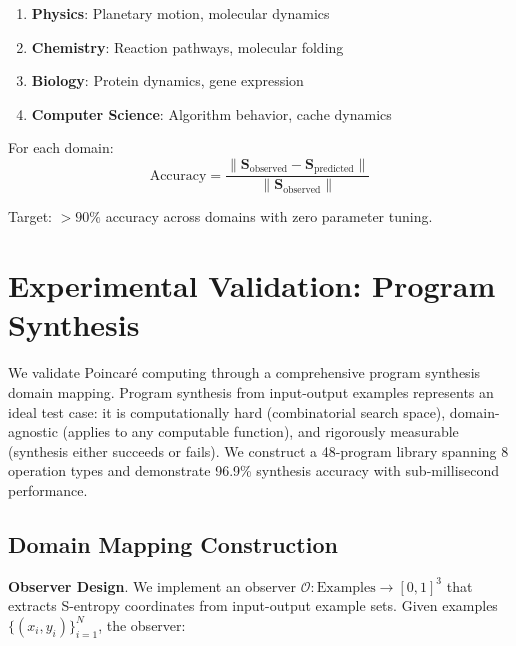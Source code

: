 \documentclass[twocolumn,10pt]{article}
\begin{document}
\begin{enumerate}
\item \textbf{Physics}: Planetary motion, molecular dynamics
\item \textbf{Chemistry}: Reaction pathways, molecular folding
\item \textbf{Biology}: Protein dynamics, gene expression
\item \textbf{Computer Science}: Algorithm behavior, cache dynamics
\end{enumerate}

For each domain:
\begin{equation}
\text{Accuracy} = \frac{\|\mathbf{S}_{\text{observed}} - \mathbf{S}_{\text{predicted}}\|}{\|\mathbf{S}_{\text{observed}}\|}
\end{equation}

Target: $> 90\%$ accuracy across domains with zero parameter tuning.

\section{Experimental Validation: Program Synthesis}

We validate Poincaré computing through a comprehensive program synthesis domain mapping. Program synthesis from input-output examples represents an ideal test case: it is computationally hard (combinatorial search space), domain-agnostic (applies to any computable function), and rigorously measurable (synthesis either succeeds or fails). We construct a 48-program library spanning 8 operation types and demonstrate 96.9\% synthesis accuracy with sub-millisecond performance.

\subsection{Domain Mapping Construction}

\textbf{Observer Design}. We implement an observer $\mathcal{O}: \text{Examples} \to [0,1]^3$ that extracts S-entropy coordinates from input-output example sets. Given examples $\{(x_i, y_i)\}_{i=1}^N$, the observer:
\end{document}
